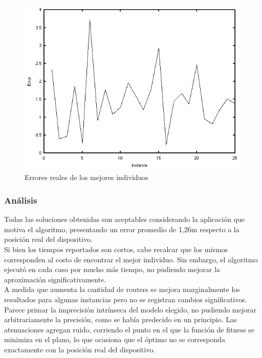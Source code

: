 \documentclass[journal]{IEEEtran}
\begin{document}
\begin{figure}[h]
\centering
\includegraphics[width=\linewidth]{errors.png}
\caption{Errores reales de los mejores individuos}
\label{fig:errors}
\end{figure}

\subsubsection*{Análisis}

Todas las soluciones obtenidas son aceptables considerando la aplicación que motiva el algoritmo, presentando un error promedio de 1,26m respecto a la posición real del dispositivo.\\

Si bien los tiempos reportados son cortos, cabe recalcar que los mismos corresponden al costo de encontrar el mejor individuo. Sin embargo, el algoritmo ejecutó en cada caso por mucho más tiempo, no pudiendo mejorar la aproximación significativamente.\\

A medida que aumenta la cantidad de routers se mejora marginalmente los resultados para algunas instancias pero no se registran cambios significativos.\\

Parece primar la imprecisión intrínseca del modelo elegido, no pudiendo mejorar arbitrariamente la precisión, como se había predecido en un principio. Las atenuaciones agregan ruido, corriendo el punto en el que la función de fitness se minimiza en el plano, lo que ocasiona que el óptimo no se corresponda exactamente con la posición real del dispositivo.\\
\end{document}
